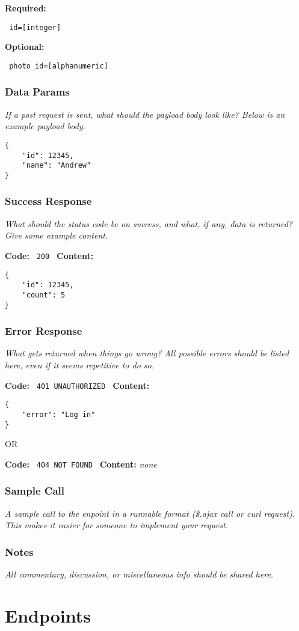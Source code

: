\documentclass[a4paper, 12pt]{article}
\begin{document}
			\textbf{Required:}

			\verb| id=[integer] |

			\textbf{Optional:}

			\verb| photo_id=[alphanumeric] |

		\subsubsection{Data Params}
			\textit{If a post request is sent, what should the payload body look like? Below is an example payload body.}

			\begin{lstlisting}
{
	"id": 12345,
	"name": "Andrew"
}
			\end{lstlisting}

		\subsubsection{Success Response}
			\textit{What should the status code be on success, and what, if any, data is returned? Give some example content.}

			\textbf{Code:} \verb| 200 |
			\textbf{Content:}

			\begin{lstlisting}
{
	"id": 12345,
	"count": 5
}
			\end{lstlisting}

		\subsubsection{Error Response}
			\textit{What gets returned when things go wrong? All possible errors should be listed here, even if it seems repetitive to do so.}

			\textbf{Code:} \verb| 401 UNAUTHORIZED |
			\textbf{Content:}

			\begin{lstlisting}
{
	"error": "Log in"
}
			\end{lstlisting}

			OR

			\textbf{Code:} \verb| 404 NOT FOUND |
			\textbf{Content:} \textit{none}

		\subsubsection{Sample Call}
			\textit{A sample call to the enpoint in a runnable format (\$.ajax call or curl request). This makes it easier for someone to implement your request.}

		\subsubsection{Notes}
			\textit{All commentary, discussion, or miscellaneous info should be shared here.}

\newpage
\section{Endpoints}
	
\end{document}
